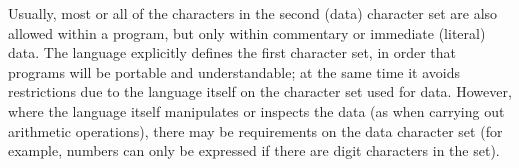 Usually, most or all of the characters in the second (data) character
set are also allowed within a \nr{} program, but only within
commentary or immediate (literal) data.
 The \nr{} language explicitly defines the first character set, in
order that programs will be portable and understandable; at the same
time it avoids restrictions due to the language itself on the character
set used for data.
However, where the language itself manipulates or inspects the data (as
when carrying out arithmetic operations), there may be requirements on
the data character set (for example, numbers can only be expressed if
there are digit characters in the set).
